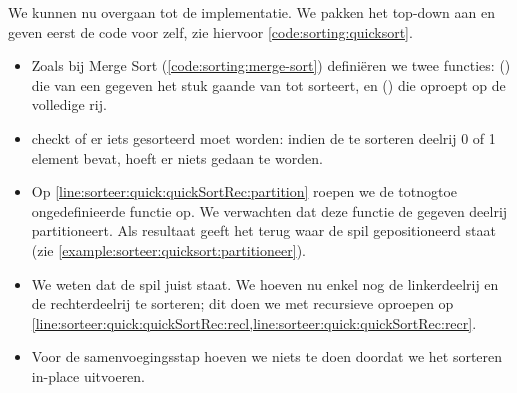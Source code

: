 We kunnen nu overgaan tot de implementatie. We pakken het top-down aan
en geven eerst de code voor  zelf, zie hiervoor
\cref{code:sorting:quicksort}.
\begin{itemize}
  \item Zoals bij Merge Sort (\cref{code:sorting:merge-sort}) defini\"eren we
        twee functies: 
        ()
        die van een gegeven  het stuk gaande van 
        tot  sorteert, en 
        ()
        die  oproept op de volledige rij.
  \item {} checkt of er iets gesorteerd moet worden:
        indien de te sorteren deelrij 0 of 1 element bevat, hoeft er niets gedaan te worden.
  \item Op \cref{line:sorteer:quick:quickSortRec:partition} roepen we de
        totnogtoe ongedefinieerde functie  op.
        We verwachten dat deze functie de gegeven deelrij  partitioneert.
        Als resultaat geeft het terug waar de spil gepositioneerd staat (zie
        \cref{example:sorteer:quicksort:partitioneer}).
  \item We weten dat de spil juist staat. We hoeven nu enkel nog de linkerdeelrij
         en de rechterdeelrij
         te sorteren; dit doen
        we met recursieve oproepen op
        \cref{line:sorteer:quick:quickSortRec:recl,line:sorteer:quick:quickSortRec:recr}.
  \item Voor de samenvoegingsstap hoeven we niets te doen doordat we het sorteren
        in-place uitvoeren.
\end{itemize}

